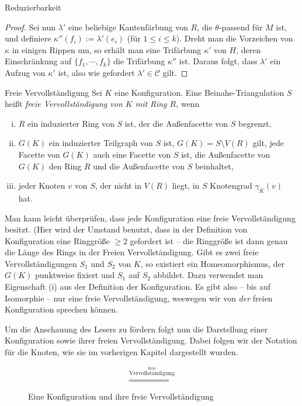 \begin{section}{Reduzierbarkeit}
\begin{proof}
  Sei nun $\lambda'$ eine beliebige Kantenfärbung von $R$, die $\theta$-passend für $M$ ist, und definiere $\kappa''(f_i) := \lambda'(e_i)$ (für $1\leq i \leq k$). Dreht man die Vorzeichen von $\kappa$ in einigen Rippen um, so erhält man eine Trifärbung $\kappa'$ von $H$, deren Einschränkung auf $\{f_1,\cdots,f_k\}$ die Trifärbung $\kappa''$ ist. Daraus folgt, dass $\lambda'$ ein Aufzug von $\kappa'$ ist, also wie gefordert $\lambda' \in \mathscr{C}$ gilt. 
 \end{proof}

\begin{definition}{Freie Vervollständigung}
  Sei $K$ eine Konfiguration. Eine Beinahe-Triangulation $S$ heißt \textit{freie Vervollständigung von $K$ mit Ring $R$}, wenn
  \begin{enumerate}[(i)]
   \item $R$ ein induzierter Ring von $S$ ist, der die Außenfacette von $S$ begrenzt,
   \item $G(K)$ ein induzierter Teilgraph von $S$ ist, $G(K) = S \setminus V(R)$ gilt, jede Facette von $G(K)$ auch eine Facette von $S$ ist, die Außenfacette von $G(K)$ den Ring $R$ und die Außenfacette von $S$ beinhaltet,
   \item jeder Knoten $v$ von $S$, der nicht in $V(R)$ liegt, in $S$ Knotengrad $\gamma_K(v)$ hat.
  \end{enumerate}
 \end{definition}
 
 Man kann leicht überprüfen, dass jede Konfiguration eine freie Vervollständigung besitzt. (Hier wird der Umstand benutzt, dass in der Definition von Konfiguration eine Ringgröße $\geq 2$ gefordert ist -- die Ringgröße ist dann genau die Länge des Rings in der Freien Vervollständigung. Gibt es zwei freie Vervollständigungen $S_1$ und $S_2$ von $K$, so existiert ein Homeomorphismus, der $G(K)$ punktweise fixiert und $S_1$ auf $S_2$ abbildet. Dazu verwendet man Eigenschaft (i) aus der Definition der Konfiguration. Es gibt also -- bis auf Isomorphie -- nur eine freie Vervollständigung, weswegen wir von \textit{der} freien Konfiguration sprechen können.
 
 Um die Anschauung des Lesers zu fördern folgt nun die Darstellung einer Konfiguration sowie ihrer freien Vervollständigung. Dabei folgen wir der Notation für die Knoten, wie sie im vorherigen Kapitel dargestellt wurden.
 
 \begin{figure}[hb]
  \label{fig2}
  \[  \overset{\overset{\text{freie}}{\text{Vervollständigung}}}{\Longrightarrow}  \]
  \caption[Eine Konfiguration und ihre freie Vervollständigung]{Eine Konfiguration und ihre freie Vervollständigung}
 \end{figure}


\end{section}
